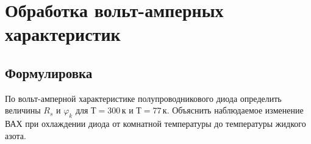 \documentclass[12pt]{article}
\begin{document}
	
	\setcounter{page}{2}

	\tableofcontents
	\newpage

	\section{Обработка вольт-амперных характеристик}
	\subsection{Формулировка}
	По вольт-амперной характеристике полупроводникового диода определить величины $R_s$ и $\varphi_k$ для $Т = 300\,\text{к}$ и $Т = 77\,\text{к}$. Объяснить наблюдаемое изменение ВАХ при охлаждении диода от комнатной температуры до температуры жидкого азота.
\end{document}
